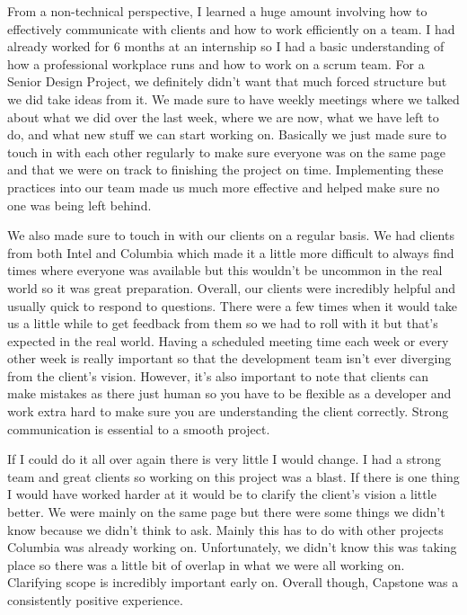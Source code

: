 \documentclass[10pt,journal,compsoc,onecolumn, draftclsnofoot]{IEEEtran}
\begin{document}
From a non-technical perspective, I learned a huge amount involving how to effectively communicate with clients and how to work efficiently on a team. I had already worked for 6 months at an internship so I had a basic understanding of how a professional workplace runs and how to work on a scrum team. For a Senior Design Project, we definitely didn’t want that much forced structure but we did take ideas from it. We made sure to have weekly meetings where we talked about what we did over the last week, where we are now, what we have left to do, and what new stuff we can start working on. Basically we just made sure to touch in with each other regularly to make sure everyone was on the same page and that we were on track to finishing the project on time. Implementing these practices into our team made us much more effective and helped make sure no one was being left behind.

We also made sure to touch in with our clients on a regular basis. We had clients from both Intel and Columbia which made it a little more difficult to always find times where everyone was available but this wouldn’t be uncommon in the real world so it was great preparation. Overall, our clients were incredibly helpful and usually quick to respond to questions. There were a few times when it would take us a little while to get feedback from them so we had to roll with it but that’s expected in the real world. Having a scheduled meeting time each week or every other week is really important so that the development team isn’t ever diverging from the client’s vision. However, it’s also important to note that clients can make mistakes as there just human so you have to be flexible as a developer and work extra hard to make sure you are understanding the client correctly. Strong communication is essential to a smooth project.

If I could do it all over again there is very little I would change. I had a strong team and great clients so working on this project was a blast. If there is one thing I would have worked harder at it would be to clarify the client’s vision a little better. We were mainly on the same page but there were some things we didn’t know because we didn’t think to ask. Mainly this has to do with other projects Columbia was already working on. Unfortunately, we didn’t know this was taking place so there was a little bit of overlap in what we were all working on. Clarifying scope is incredibly important early on. Overall though, Capstone was a consistently positive experience.
\end{document}
